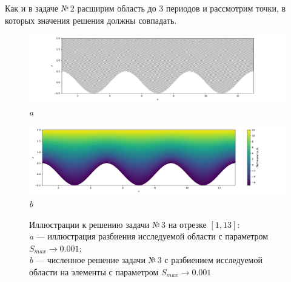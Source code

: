 \documentclass[12pt, a4paper]{article}
\begin{document}
			Как и в задаче №\,2 расширим область до 3 периодов и рассмотрим точки, в которых значения решения должны совпадать.			
			
			\newpage
			
			\begin{figure}[h]       
				\begin{center} 
					{ 
						\begin{minipage}{0.9\textwidth} 
							\centering 
							\hspace*{-25mm}
							\includegraphics[width=1.35\columnwidth]{Test_domain_1_1_sin_mesh_0001_3_in_row_calfem_net_1.png}\\ 
							\textit{a} 
						\end{minipage}                                 
					} 
					{ 
						\begin{minipage}{1\textwidth} 
							\centering 
							\hspace*{-8.5mm}
							\includegraphics[width=1.2\columnwidth]{Test_domain_1_1_sin_mesh_0001_3_in_row_calfem.png}\\ 
							\textit{b} 
						\end{minipage}                                 
					} 
					
				\end{center} 
				\vspace*{-2.0mm} 
				\caption{Иллюстрации к решению задачи №\,3 на отрезке $\left[ 1, 13 \right]$:\\
					\textit{a} --- иллюстрация разбиения исследуемой области с параметром $S_{max} \rightarrow 0.001$; \\
					\textit{b} --- численное решение задачи №\,3 с разбиением исследуемой области на  элементы с параметром $S_{max} \rightarrow 0.001$ \\
				} 
			\end{figure}
		
\end{document}
